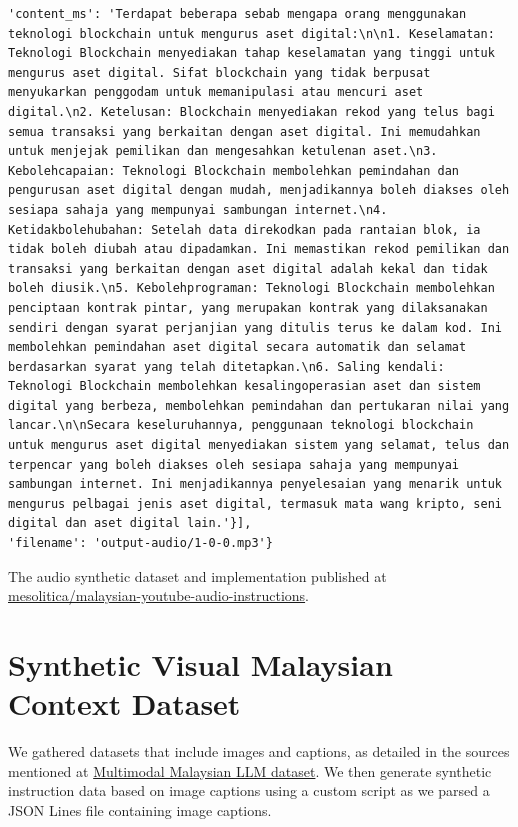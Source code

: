 \documentclass[preprint]{article}
\begin{document}
\begin{lstlisting}[breaklines=true]
  'content_ms': 'Terdapat beberapa sebab mengapa orang menggunakan teknologi blockchain untuk mengurus aset digital:\n\n1. Keselamatan: Teknologi Blockchain menyediakan tahap keselamatan yang tinggi untuk mengurus aset digital. Sifat blockchain yang tidak berpusat menyukarkan penggodam untuk memanipulasi atau mencuri aset digital.\n2. Ketelusan: Blockchain menyediakan rekod yang telus bagi semua transaksi yang berkaitan dengan aset digital. Ini memudahkan untuk menjejak pemilikan dan mengesahkan ketulenan aset.\n3. Kebolehcapaian: Teknologi Blockchain membolehkan pemindahan dan pengurusan aset digital dengan mudah, menjadikannya boleh diakses oleh sesiapa sahaja yang mempunyai sambungan internet.\n4. Ketidakbolehubahan: Setelah data direkodkan pada rantaian blok, ia tidak boleh diubah atau dipadamkan. Ini memastikan rekod pemilikan dan transaksi yang berkaitan dengan aset digital adalah kekal dan tidak boleh diusik.\n5. Kebolehprograman: Teknologi Blockchain membolehkan penciptaan kontrak pintar, yang merupakan kontrak yang dilaksanakan sendiri dengan syarat perjanjian yang ditulis terus ke dalam kod. Ini membolehkan pemindahan aset digital secara automatik dan selamat berdasarkan syarat yang telah ditetapkan.\n6. Saling kendali: Teknologi Blockchain membolehkan kesalingoperasian aset dan sistem digital yang berbeza, membolehkan pemindahan dan pertukaran nilai yang lancar.\n\nSecara keseluruhannya, penggunaan teknologi blockchain untuk mengurus aset digital menyediakan sistem yang selamat, telus dan terpencar yang boleh diakses oleh sesiapa sahaja yang mempunyai sambungan internet. Ini menjadikannya penyelesaian yang menarik untuk mengurus pelbagai jenis aset digital, termasuk mata wang kripto, seni digital dan aset digital lain.'}],
'filename': 'output-audio/1-0-0.mp3'}
\end{lstlisting}

The audio synthetic dataset and implementation published at \href{https://huggingface.co/datasets/mesolitica/malaysian-youtube-audio-instructions}{mesolitica/malaysian-youtube-audio-instructions}.

\section{Synthetic Visual Malaysian Context Dataset}

We gathered datasets that include images and captions, as detailed in the sources mentioned at \href{https://huggingface.co/collections/mesolitica/multimodal-malaysian-llm-dataset-653a16214037a1bc4417eb3a}{Multimodal Malaysian LLM dataset}. We then generate synthetic instruction data based on image captions using a custom script as we parsed a JSON Lines file containing image captions.
\end{document}
